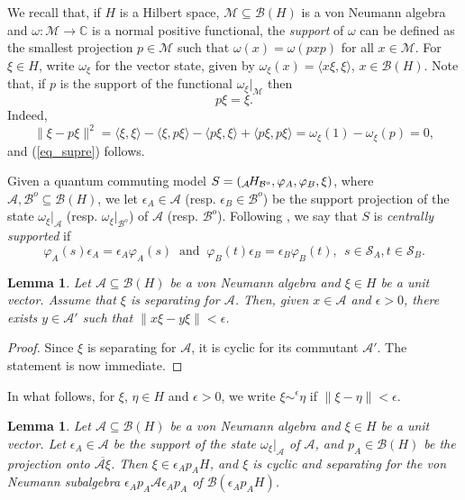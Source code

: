 \documentclass[11pt]{amsart}
\newtheorem{lemma}[theorem]{Lemma}
\theoremstyle{definition}
\newcommand{\cl}[1]{\mathcal{#1}}
\newcommand{\bb}[1]{\mathbb{#1}}
\begin{document}
We recall that, if $H$ is a Hilbert space, $\cl M \subseteq \cl B(H)$ 
is a von Neumann algebra and $\omega : \cl M\to \bb{C}$
is a normal positive functional, the \emph{support} of $\omega$ 
\cite[Definition 7.2.4]{kadison-ringrose}
can be defined as
the smallest projection $p\in \cl M$ such that $\omega(x) = \omega(pxp)$ for all $x\in \cl M$. 
For $\xi\in H$, write $\omega_\xi$ for the vector state, given by 
$\omega_\xi(x) = \langle x\xi,\xi\rangle$, $x\in \cl B(H)$.
Note that, if $p$ is the support of the functional $\omega_{\xi}|_{\cl M}$ then 
\begin{equation}\label{eq_supre}
p\xi = \xi.
\end{equation} 
Indeed, 
$$\|\xi-p\xi\|^2=\langle \xi,\xi\rangle-\langle \xi,p\xi\rangle-\langle p\xi,\xi\rangle+\langle p\xi,p\xi\rangle=\omega_\xi(1)-\omega_\xi(p)=0,$$
and (\ref{eq_supre}) follows. 

Given a quantum commuting model $S=(_{\cl A}\hspace{-0.04cm}H_{\cl B^o}, \varphi_A, \varphi_B, \xi)$, 
where $\cl A, \cl B^o\subseteq \cl B(H)$,
we let $\epsilon_A \in \cl A$ (resp. $\epsilon_B\in \cl B^o$) 
be the support projection of the state $\omega_{\xi}|_{\cl A}$
(resp. $\omega_{\xi}|_{\cl B^o}$) of $\cl A$ (resp. $\cl B^o$). Following \cite{pszz}, we say that $S$ is \emph{centrally supported} if 
$$\varphi_A(s)\epsilon_A = \epsilon_A\varphi_A(s) \ 
\mbox{ and } \ \varphi_B(t)\epsilon_B = \epsilon_B\varphi_B(t),
\ \ s\in \cl S_A, t\in \cl S_B.$$


\begin{lemma}\label{uptoeps}
    Let $\cl A\subseteq\cl B(H)$ be a von Neumann algebra and 
    $\xi\in H$ be a unit vector. 
    Assume that $\xi$ is separating for $\cl A$.
    Then, given $x\in\cl A$ and $\epsilon > 0$, there exists $y\in\cl A'$ such that $\|x\xi-y\xi\|<\epsilon$. 
\end{lemma}

\begin{proof}
Since $\xi$ is separating for $\cl A$, it is cyclic for its commutant 
$\cl A'$. The statement is now immediate.
\end{proof}



In what follows, for $\xi$, $\eta\in H$ and $\epsilon > 0$, 
we write $\xi\sim^\epsilon \eta$ if $\|\xi-\eta\|<\epsilon$.

\begin{lemma}\label{sep_cycl}
 Let $\cl A \subseteq \cl B(H)$ be a von Neumann algebra and  $\xi\in H$
 be a unit vector. Let  $\epsilon_A\in \cl A$ be the support 
 of the state $\omega_\xi|_{\cl A}$ of $\cl A$, 
 and $p_A\in \cl B(H)$ be the projection onto 
 $\overline{\cl A\xi}$.  Then $\xi \in \epsilon_Ap_AH$, and 
 $\xi$ is cyclic and separating for the von Neumann subalgebra 
 $\epsilon_Ap_A\cl A\epsilon_Ap_A$ of $\cl B(\epsilon_Ap_AH)$. 
\end{lemma}
\end{document}

